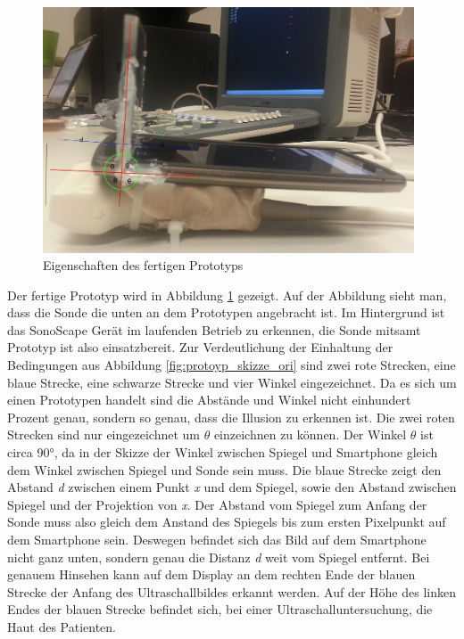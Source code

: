 \begin{figure}[h]
	\centering
	\includegraphics[width=0.98\textwidth]{Prototypen_Bau/Prototyp_fertig}
	\caption{Eigenschaften des fertigen Prototyps}
	\label{fig:protoyp}
\end{figure}
Der fertige Prototyp wird in Abbildung \ref{fig:protoyp} gezeigt. Auf der Abbildung sieht man, dass die Sonde die unten an dem Prototypen angebracht ist. Im Hintergrund ist das SonoScape Gerät im laufenden Betrieb zu erkennen, die Sonde mitsamt Prototyp ist also einsatzbereit. Zur Verdeutlichung der Einhaltung der Bedingungen aus Abbildung \ref{fig:protoyp_skizze_ori} sind zwei rote Strecken, eine blaue Strecke, eine schwarze Strecke und vier Winkel eingezeichnet. Da es sich um einen Prototypen handelt sind die Abstände und Winkel nicht einhundert Prozent genau, sondern so genau, dass die Illusion zu erkennen ist. Die zwei roten Strecken sind nur eingezeichnet um $\theta$ einzeichnen zu können. Der Winkel $\theta$ ist circa 90°, da in der Skizze der Winkel zwischen Spiegel und Smartphone gleich dem Winkel zwischen Spiegel und Sonde sein muss. Die blaue Strecke zeigt den Abstand \textit{d} zwischen einem Punkt \textit{x} und dem Spiegel, sowie den Abstand zwischen Spiegel und der Projektion von \textit{x}. Der Abstand vom Spiegel zum Anfang der Sonde muss also gleich dem Anstand des Spiegels bis zum ersten Pixelpunkt auf dem Smartphone sein. Deswegen befindet sich das Bild auf dem Smartphone nicht ganz unten, sondern genau die Distanz \textit{d} weit vom Spiegel entfernt. Bei genauem Hinsehen kann auf dem Display an dem rechten Ende der blauen Strecke der Anfang des Ultraschallbildes erkannt werden. Auf der Höhe des linken Endes der blauen Strecke befindet sich, bei einer Ultraschalluntersuchung, die Haut des Patienten.\\
